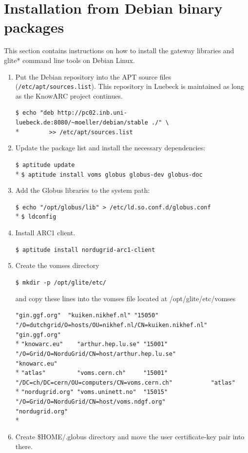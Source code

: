\documentclass{article}
\begin{document}
\appendix
\section{Installation from Debian binary packages}
\label{Debian install}
This section contains instructions on how to install the gateway libraries and glite* command line tools on Debian Linux.
\begin{enumerate}
\item Put the Debian repository into the APT source files (\texttt{/etc/apt/sources.list}). This repository in Luebeck is maintained as long as the KnowARC project continues.
\begin{shaded}\verb#$ echo "deb http://pc02.inb.uni-luebeck.de:8080/~moeller/debian/stable ./" \#\\*
\verb#        >> /etc/apt/sources.list #\end{shaded}
\item Update the package list and install the necessary dependencies:
\begin{shaded}\verb#$ aptitude update#\\*
\verb#$ aptitude install voms globus globus-dev globus-doc#\end{shaded}
\item Add the Globus libraries to the system path:
\begin{shaded}\verb#$ echo "/opt/globus/lib" > /etc/ld.so.conf.d/globus.conf#\\*
\verb#$ ldconfig#\end{shaded}
\item Install ARC1 client.
\begin{shaded}\verb#$ aptitude install nordugrid-arc1-client#\end{shaded}
\item Create the vomses directory
\begin{shaded}\verb#$ mkdir -p /opt/glite/etc/#\end{shaded}
and copy these lines into the vomses file located at /opt/glite/etc/vomses
\begin{footnotesize}
\begin{shaded}
\verb#"gin.ggf.org"  "kuiken.nikhef.nl" "15050" "/O=dutchgrid/O=hosts/OU=nikhef.nl/CN=kuiken.nikhef.nl" "gin.ggf.org"#\\*
\verb#"knowarc.eu"    "arthur.hep.lu.se" "15001" "/O=Grid/O=NorduGrid/CN=host/arthur.hep.lu.se"          "knowarc.eu"#\\*
\verb#"atlas"         "voms.cern.ch"     "15001" "/DC=ch/DC=cern/OU=computers/CN=voms.cern.ch"           "atlas"#\\*
\verb#"nordugrid.org" "voms.uninett.no"  "15015" "/O=Grid/O=NorduGrid/CN=host/voms.ndgf.org"          "nordugrid.org"#\\*
\end{shaded}
\end{footnotesize}
\item Create \$HOME/.globus directory and move the user certificate-key pair into there.
\end{enumerate}

\end{document}
